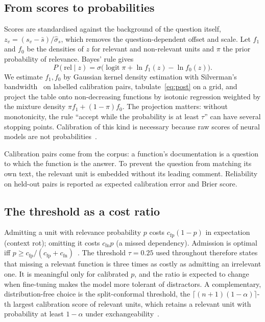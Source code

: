 \documentclass[10pt,twocolumn]{article}
\theoremstyle{definition}
\theoremstyle{remark}
\newcommand{\logit}{\operatorname{logit}}
\newcommand{\sigm}{\sigma}
\begin{document}
\subsection{From scores to probabilities}
Scores are standardised against the background of the question itself, $z_v=(s_v-\bar s)/\hat\sigma_s$, which removes the question-dependent offset and scale.
Let $f_1$ and $f_0$ be the densities of $z$ for relevant and non-relevant units and $\pi$ the prior probability of relevance.
Bayes' rule gives
\begin{equation}\label{eq:post}
P(\mathrm{rel}\mid z)=\sigm\bigl(\logit\pi+\ln f_1(z)-\ln f_0(z)\bigr).
\end{equation}
We estimate $f_1,f_0$ by Gaussian kernel density estimation with Silverman's bandwidth~\cite{parzen1962,rosenblatt1956} on labelled calibration pairs, tabulate~\eqref{eq:post} on a grid, and project the table onto non-decreasing functions by isotonic regression weighted by the mixture density $\pi f_1+(1-\pi)f_0$.
The projection matters: without monotonicity, the rule ``accept while the probability is at least $\tau$'' can have several stopping points.
Calibration of this kind is necessary because raw scores of neural models are not probabilities~\cite{guo2017calibration}.

Calibration pairs come from the corpus: a function's documentation is a question to which the function is the answer.
To prevent the question from matching its own text, the relevant unit is embedded without its leading comment.
Reliability on held-out pairs is reported as expected calibration error and Brier score.

\subsection{The threshold as a cost ratio}
Admitting a unit with relevance probability $p$ costs $c_{\mathrm{fp}}(1-p)$ in expectation (context rot); omitting it costs $c_{\mathrm{fn}}p$ (a missed dependency).
Admission is optimal iff $p\ge c_{\mathrm{fp}}/(c_{\mathrm{fp}}+c_{\mathrm{fn}})$~\cite{elkan2001cost}.
The threshold $\tau=0.25$ used throughout therefore states that missing a relevant function is three times as costly as admitting an irrelevant one.
It is meaningful only for calibrated $p$, and the ratio is expected to change when fine-tuning makes the model more tolerant of distractors.
A complementary, distribution-free choice is the split-conformal threshold, the $\lceil(n+1)(1-\alpha)\rceil$-th largest calibration score of relevant units, which retains a relevant unit with probability at least $1-\alpha$ under exchangeability~\cite{angelopoulos2021gentle,chakraborty2026conformal}.
\end{document}
